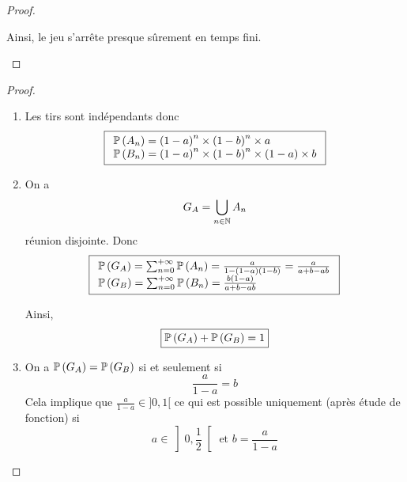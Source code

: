 \begin{proof}
\begin{enumerate}
        Ainsi, le jeu s'arrête presque sûrement en temps fini.
    \end{enumerate}
\end{proof}

\begin{proof}
    \phantom{}
    \begin{enumerate}
        \item Les tirs sont indépendants donc 
        \begin{equation}
            \boxed{
                \begin{array}[]{l}
                    \P\left(A_{n}\right)=\left(1-a\right)^{n}\times\left(1-b\right)^{n}\times a\\
                    \P\left(B_{n}\right)=\left(1-a\right)^{n}\times\left(1-b\right)^{n}\times \left(1-a\right)\times b
                \end{array}
            }    
        \end{equation}
        
        \item On a 
        \begin{equation}
            G_{A}=\bigcup_{n\in\N}A_{n}
        \end{equation}
        réunion disjointe. Donc 
        \begin{equation}
            \boxed{
                \begin{array}[]{l}
                    \P\left(G_{A}\right)=\sum_{n=0}^{+\infty}\P\left(A_{n}\right)=\frac{a}{1-\left(1-a\right)\left(1-b\right)}=\frac{a}{a+b-ab}\\
                    \P\left(G_{B}\right)=\sum_{n=0}^{+\infty}\P\left(B_{n}\right)=\frac{b\left(1-a\right)}{a+b-ab}\\
                \end{array}
            }
        \end{equation}
        
        Ainsi, 
        \begin{equation}
            \boxed{\P\left(G_{A}\right)+\P\left(G_{B}\right)=1}
        \end{equation}

        \item On a $\P\left(G_{A}\right)=\P\left(G_{B}\right)$ si et seulement si 
        \begin{equation}
            \frac{a}{1-a}=b
        \end{equation}
        Cela implique que $\frac{a}{1-a}\in]0,1[$ ce qui est possible uniquement (après étude de fonction) si
        \begin{equation}
            \boxed{a\in\left]0,\frac{1}{2}\right[\text{ et }b=\frac{a}{1-a}}
        \end{equation}
    \end{enumerate}
\end{proof}

